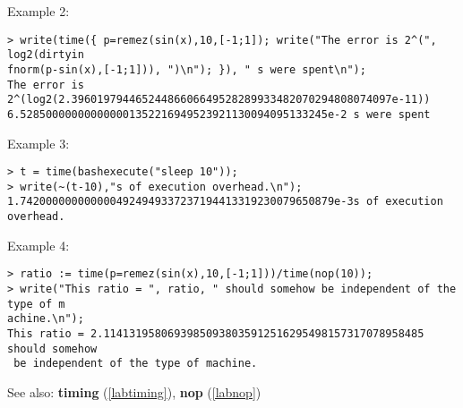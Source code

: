 \noindent Example 2: 
\begin{center}\begin{minipage}{15cm}\begin{Verbatim}[frame=single,commandchars=\\\|\~]
> write(time({ p=remez(sin(x),10,[-1;1]); write("The error is 2^(", log2(dirtyin
fnorm(p-sin(x),[-1;1])), ")\n"); }), " s were spent\n");
The error is 2^(log2(2.39601979446524486606649528289933482070294808074097e-11))
6.528500000000000001352216949523921130094095133245e-2 s were spent
\end{Verbatim}
\end{minipage}\end{center}
\noindent Example 3: 
\begin{center}\begin{minipage}{15cm}\begin{Verbatim}[frame=single,commandchars=\\\|\~]
> t = time(bashexecute("sleep 10"));
> write(~(t-10),"s of execution overhead.\n");
1.7420000000000004924949337237194413319230079650879e-3s of execution overhead.
\end{Verbatim}
\end{minipage}\end{center}
\noindent Example 4: 
\begin{center}\begin{minipage}{15cm}\begin{Verbatim}[frame=single,commandchars=\\\|\~]
> ratio := time(p=remez(sin(x),10,[-1;1]))/time(nop(10));
> write("This ratio = ", ratio, " should somehow be independent of the type of m
achine.\n");
This ratio = 2.11413195806939850938035912516295498157317078958485 should somehow
 be independent of the type of machine.
\end{Verbatim}
\end{minipage}\end{center}
See also: \textbf{timing} (\ref{labtiming}), \textbf{nop} (\ref{labnop})
